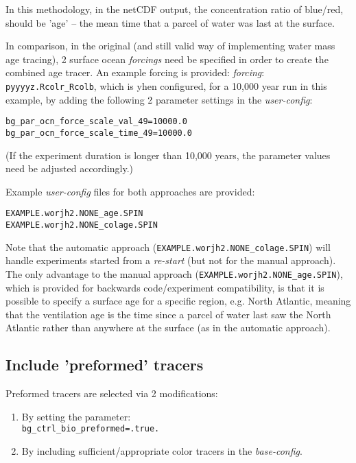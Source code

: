 \documentclass[11pt,fleqn]{book} %
\begin{document}
In this methodology, in the netCDF output, the concentration ratio of blue/red, should be 'age' -- the mean time that a parcel of water was last at the surface.

In comparison, in the original (and still valid way of implementing water mass age tracing), 2 surface ocean \textit{forcings} need be specified in order to create the combined age tracer. An example forcing is provided: \textit{forcing}: \texttt{pyyyyz.Rcolr\_Rcolb}, which is yhen configured, for a 10,000 year run in this example, by adding the following 2 parameter settings in the \textit{user-config}:
\vspace{-2pt}\begin{verbatim}
bg_par_ocn_force_scale_val_49=10000.0
bg_par_ocn_force_scale_time_49=10000.0
\end{verbatim}\vspace{-2pt}

\noindent (If the experiment duration is longer than 10,000 years, the parameter values need be adjusted accordingly.)


Example \textit{user-config} files for both approaches are provided:
\vspace{-2pt}\begin{verbatim}
EXAMPLE.worjh2.NONE_age.SPIN
EXAMPLE.worjh2.NONE_colage.SPIN
\end{verbatim}\vspace{-2pt}

\noindent Note that the automatic approach (\texttt{EXAMPLE.worjh2.NONE\_colage.SPIN}) will handle experiments started from a \textit{re-start} (but not for the manual approach). The only advantage to the manual approach (\texttt{EXAMPLE.worjh2.NONE\_age.SPIN}), which is provided for backwards code/experiment compatibility, is that it is possible to specify a surface age for a specific region, e.g. North Atlantic, meaning that the ventilation age is the time since a parcel of water last saw the North Atlantic rather than anywhere at the surface (as in the automatic approach).

%
\subsection*{Include 'preformed' tracers}
\vspace{1mm}

Preformed tracers are selected via 2 modifications:

\vspace{2mm}
\begin{enumerate}
\vspace{1mm}
\item By setting the parameter:
\\\texttt{bg\_ctrl\_bio\_preformed=.true.}
\vspace{1mm}
\item By including sufficient/appropriate color tracers in the \textit{base-config}.
\end{enumerate}
\vspace{2mm}
\end{document}
